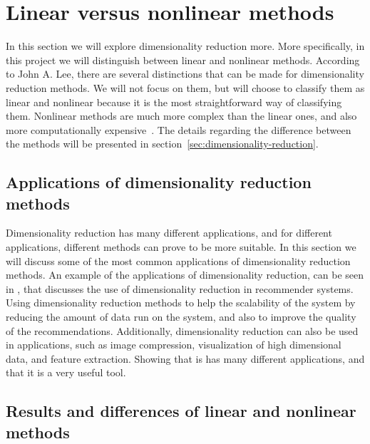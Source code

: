 \section{Linear versus nonlinear methods}\label{sec:linear-vs-nonlinear} 

In this section we will explore dimensionality reduction more. More specifically, in this project we will distinguish between linear and nonlinear methods. According to John A. Lee, there are several distinctions that can be made for dimensionality reduction methods\cite{nonlinear-dim-red-chapter-two}. We will not focus on them, but will choose to classify them as linear and nonlinear because it is the most straightforward way of classifying them. Nonlinear methods are much more complex than the linear ones, and also more computationally expensive~\cite{nonlinear-dim-red-chapter-two}. The details regarding the difference between the methods will be presented in section~\ref{sec:dimensionality-reduction}.

\subsection{Applications of dimensionality reduction methods}

Dimensionality reduction has many different applications, and for different applications, different methods can prove to be more suitable. In this section we will discuss some of the most common applications of dimensionality reduction methods. An example of the applications of dimensionality reduction, can be seen in \cite{sarwar2000application}, that discusses the use of dimensionality reduction in recommender systems. Using dimensionality reduction methods to help the scalability of the system by reducing the amount of data run on the system, and also to improve the quality of the recommendations. Additionally, dimensionality reduction can also be used in applications, such as image compression, visualization of high dimensional data, and feature extraction. Showing that is has many different applications, and that it is a very useful tool.


\subsection{Results and differences of linear and nonlinear methods}

